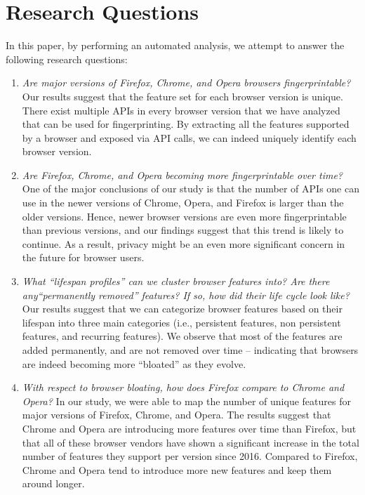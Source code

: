 \section{Research Questions}
\label{sec:research}

In this paper, by performing an automated analysis, we attempt to
answer the following research questions:

\begin{enumerate}
  
\item {\em Are major versions of Firefox, Chrome, and Opera browsers
  fingerprintable?} Our results suggest that the feature set for each
  browser version is unique. There exist multiple
  APIs in every browser version that we have analyzed that can be used
  for fingerprinting. By extracting all the features supported by a
  browser and exposed via API calls, we can indeed uniquely identify each
  browser version.

\item {\em Are Firefox, Chrome, and Opera becoming more
  fingerprintable over time?} One of the major conclusions of our
  study is that the number of APIs one can use in the newer versions
  of Chrome, Opera, and Firefox is larger than the older versions. Hence, newer
  browser versions are even more fingerprintable than previous
  versions, and our findings suggest that this trend is likely to
  continue. As a result, privacy might be an even more significant
  concern in the future for browser users.
    
\item {\em What ``lifespan profiles'' can we cluster browser features
    into? Are there any``permanently removed'' features? If so, how
    did their life cycle look like?} Our results suggest that we can
  categorize browser features based on their lifespan into three main
  categories (i.e., persistent features, non persistent features, and
  recurring features). We observe that most of the features are added
  permanently, and are not removed over time -- indicating that
  browsers are indeed becoming more ``bloated'' as they evolve.

\item {\em With respect to browser bloating, how does Firefox compare
    to Chrome and Opera?} In our study, we were able to map the number of unique
  features for major versions of Firefox, Chrome, and Opera. The results
  suggest that Chrome and Opera are introducing more features over time than
  Firefox, but that all of these browser vendors have shown a significant
  increase in the total number of features they support per version
  since 2016. Compared to Firefox, Chrome and Opera tend to introduce more new
  features and keep them around longer.
 

\end{enumerate}
